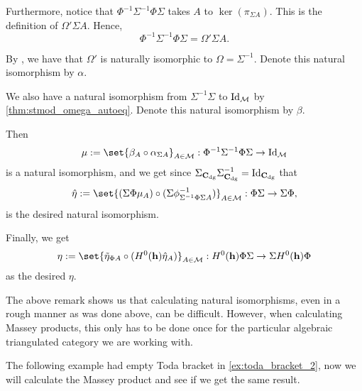 \begin{remark}
    Furthermore, notice that \( \Phi^{-1} \Sigma^{-1} \Phi \Sigma \) takes \( A \) to \( \ker(\pi_{\Sigma A}) \). This is the definition of \( \Omega' \Sigma A \). Hence,
    \[
        \Phi^{-1} \Sigma^{-1} \Phi \Sigma = \Omega' \Sigma A.
    \]

    By \cite[p.\ 13]{Happel_1988}, we have that \( \Omega' \) is naturally isomorphic to \( \Omega = \Sigma^{-1} \). Denote this natural isomorphism by \( \alpha \).

    We also have a natural isomorphism from \( \Sigma^{-1} \Sigma \) to \( \operatorname{Id}_{{\mathcal{M}}} \) by \autoref{thm:stmod_omega_autoeq}. Denote this natural isomorphism by \( \beta \).

    Then
    \[
       \mu := \set{ \beta_A \circ \alpha_{\Sigma A} }_{A \in \Mc} :\Phi^{-1} \Sigma^{-1} \Phi \Sigma \to \Id_{\Mc}
    \]
    is a natural isomorphism, and we get since \( \Sigma_{\operatorname{\mathbf{C}}_{\operatorname{dg}}} \Sigma^{-1}_{\operatorname{\mathbf{C}}_{\operatorname{dg}}} = \operatorname{Id}_{\operatorname{\mathbf{C}}_{\operatorname{dg}}} \) that
    \[
        \hat{\eta} := \set{(\Sigma \Phi \mu_A) \circ (\Sigma \phi^{-1}_{\Sigma^{-1} \Phi \Sigma A})}_{A \in \Mc}: \Phi \Sigma \to \Sigma \Phi,
    \]
    is the desired natural isomorphism.

    Finally, we get
    \[
        \eta := \set{ \tilde{\eta}_{\Phi A} \circ (H^0(\mathbf{h}) \hat{\eta}_A) }_{A \in \Mc}: H^0(\mathbf{h}) \Phi \Sigma \to \Sigma H^0(\mathbf{h}) \Phi
    \]
    as the desired \( \eta \).
\end{remark}

The above remark shows us that calculating natural isomorphisms, even in a rough manner as was done above, can be difficult. However, when calculating Massey products, this only has to be done once for the particular algebraic triangulated category we are working with.

The following example had empty Toda bracket in \autoref{ex:toda_bracket_2}, now we will calculate the Massey product and see if we get the same result.

